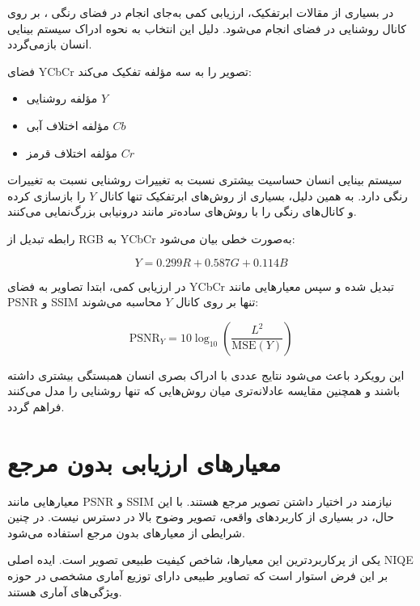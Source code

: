 در بسیاری از مقالات ابرتفکیک، ارزیابی کمی به‌جای انجام در فضای رنگی ، بر روی کانال روشنایی در فضای  انجام می‌شود. دلیل این انتخاب به نحوه ادراک سیستم بینایی انسان بازمی‌گردد.

فضای YCbCr تصویر را به سه مؤلفه تفکیک می‌کند:
\begin{itemize}
	\item مؤلفه روشنایی $Y$  
	\item مؤلفه اختلاف آبی $Cb$  
	\item مؤلفه اختلاف قرمز $Cr$
\end{itemize}

سیستم بینایی انسان حساسیت بیشتری نسبت به تغییرات روشنایی نسبت به تغییرات رنگی دارد. به همین دلیل، بسیاری از روش‌های ابرتفکیک تنها کانال $Y$ را بازسازی کرده و کانال‌های رنگی را با روش‌های ساده‌تر مانند درونیابی بزرگ‌نمایی می‌کنند.

رابطه تبدیل از RGB به YCbCr به‌صورت خطی بیان می‌شود:

\begin{equation}
	Y = 0.299R + 0.587G + 0.114B
\end{equation}

در ارزیابی کمی، ابتدا تصاویر به فضای YCbCr تبدیل شده و سپس معیارهایی مانند PSNR و SSIM تنها بر روی کانال $Y$ محاسبه می‌شوند:

\begin{equation}
	\text{PSNR}_Y =
	10 \log_{10}
	\left(
	\frac{L^2}{\text{MSE}(Y)}
	\right)
\end{equation}

این رویکرد باعث می‌شود نتایج عددی با ادراک بصری انسان همبستگی بیشتری داشته باشند و همچنین مقایسه عادلانه‌تری میان روش‌هایی که تنها روشنایی را مدل می‌کنند فراهم گردد.

\section{معیارهای ارزیابی بدون مرجع}

معیارهایی مانند PSNR و SSIM نیازمند در اختیار داشتن تصویر مرجع  هستند. با این حال، در بسیاری از کاربردهای واقعی، تصویر وضوح بالا در دسترس نیست. در چنین شرایطی از معیارهای بدون مرجع استفاده می‌شود.

یکی از پرکاربردترین این معیارها، شاخص کیفیت طبیعی تصویر است. ایده اصلی NIQE بر این فرض استوار است که تصاویر طبیعی دارای توزیع آماری مشخصی در حوزه ویژگی‌های آماری هستند.

